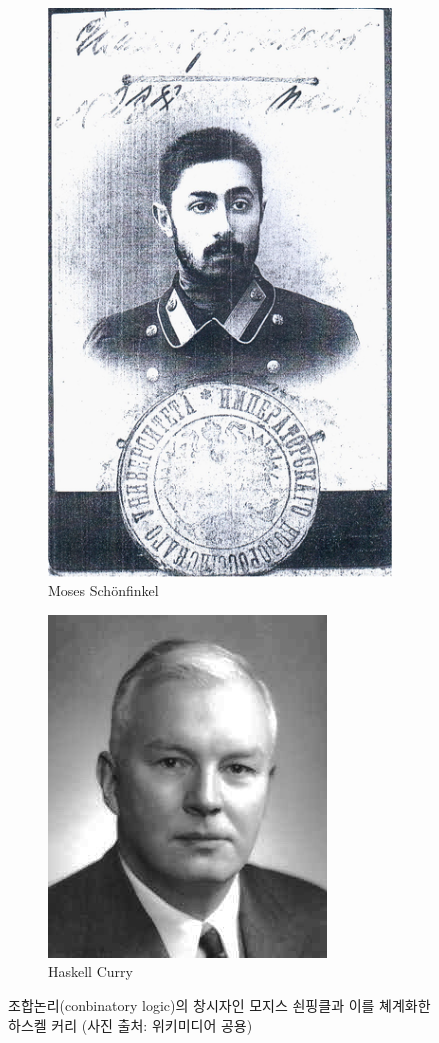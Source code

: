 \documentclass[b5paper,chapter,figtabcapt]{oblivoir}
\begin{document}
\begin{figure}\centering
\begin{subfigure}[b]{.3\textwidth}\centering
\includegraphics[trim={70pt 250pt 80pt 110pt},clip,scale=.9]{Schonfinkel.png}
\caption{Moses Sch\"onfinkel}
\end{subfigure}
\begin{subfigure}[b]{.3\textwidth}\centering
\includegraphics[scale=.8]{HaskellBCurry.jpg}
\caption{Haskell Curry}
\end{subfigure}
\caption{조합논리(conbinatory logic)의 창시자인
         모지스 쇤핑클과 이를 쳬계화한 하스켈 커리
         {\footnotesize(사진 출처: 위키미디어 공용)} }
\end{figure}
\end{document}
